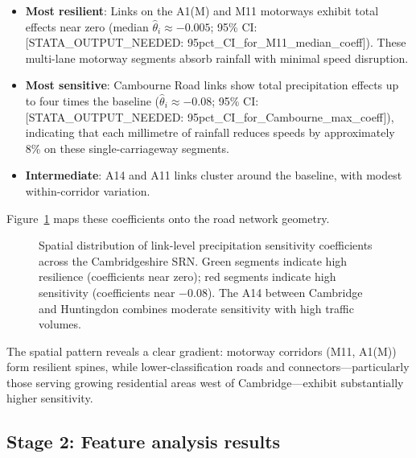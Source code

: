 \documentclass[review]{elsarticle}
\begin{document}
\begin{itemize}
    \item \textbf{Most resilient}: Links on the A1(M) and M11 motorways exhibit total effects near zero (median $\hat{\theta}_i \approx -0.005$; 95\% CI: [STATA\_OUTPUT\_NEEDED: 95pct\_CI\_for\_M11\_median\_coeff]). These multi-lane motorway segments absorb rainfall with minimal speed disruption.
    \item \textbf{Most sensitive}: Cambourne Road links show total precipitation effects up to four times the baseline ($\hat{\theta}_i \approx -0.08$; 95\% CI: [STATA\_OUTPUT\_NEEDED: 95pct\_CI\_for\_Cambourne\_max\_coeff]), indicating that each millimetre of rainfall reduces speeds by approximately 8\% on these single-carriageway segments.
    \item \textbf{Intermediate}: A14 and A11 links cluster around the baseline, with modest within-corridor variation.
\end{itemize}

Figure~\ref{fig:spatial_coef} maps these coefficients onto the road network geometry.

\begin{figure}[htbp]
\centering
\caption{Spatial distribution of link-level precipitation sensitivity coefficients across the Cambridgeshire SRN. Green segments indicate high resilience (coefficients near zero); red segments indicate high sensitivity (coefficients near $-$0.08). The A14 between Cambridge and Huntingdon combines moderate sensitivity with high traffic volumes.}
\label{fig:spatial_coef}
\end{figure}

The spatial pattern reveals a clear gradient: motorway corridors (M11, A1(M)) form resilient spines, while lower-classification roads and connectors---particularly those serving growing residential areas west of Cambridge---exhibit substantially higher sensitivity.


\subsection{Stage 2: Feature analysis results}
\label{sec:results:feature}
\end{document}
